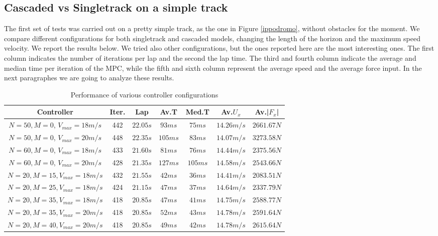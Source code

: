 \documentclass[a4paper, onecolumn, 11pt]{article}
\begin{document}
\subsection{Cascaded vs Singletrack on a simple track}
The first set of tests was carried out on a pretty simple track, as the one in
Figure \ref{ippodromo}, without obstacles for the moment. We compare different
configurations for both singletrack and cascaded models, changing the length of
the horizon and the maximum speed velocity. We report the results below. We
tried also other configurations, but the ones reported here are the most
interesting ones. The first column indicates the number of iterations per lap
and the second the lap time. The third and fourth column indicate the average
and median time per iteration of the MPC, while the fifth and sixth column
represent the average speed and the average force input. In the next paragraphes
we are going to analyze these results. 
\begin{table}[h] 
    \centering
    \caption{Performance of various controller configurations} \label{simulations}
    \hspace*{-1cm}
    \begin{tabular}{|c||c|c|c|c|c|c|}
        \hline
        \textbf{Controller} & \textbf{Iter.} & \textbf{Lap} & \textbf{Av.T} & \textbf{Med.T} & \textbf{Av.$U_x$} & \textbf{Av.|$F_x$|} \\ [0.5ex] 
        \hline
        \hline
        $N=50, M=0$, $V_{max}=18m/s$ & 442 & $22.05 s$ & $93 ms$ & $75 ms$ & $14.26 m/s$ & $2661.67 N$\\
        \hline
        $N=50, M=0$, $V_{max}=20m/s$ & 448 & $22.35 s$ & $105 ms$ & $83 ms$ & $14.07 m/s$ & $3273.58 N$\\
        \hline
        $N=60, M=0$, $V_{max}=18m/s$ & 433 & $21.60 s$ & $81 ms$ & $76 ms$ & $14.44 m/s$ & $2375.56 N$\\
        \hline
        $N=60, M=0$, $V_{max}=20m/s$ & 428 & $21.35 s$ & $127 ms$ & $105 ms$ & $14.58 m/s$ & $2543.66 N$\\
        \hline
        $N=20, M=15, V_{max}=18m/s$ & 432 & $21.55 s$ & $42 ms$ & $36 ms$ & $14.41 m/s$ & $2083.51 N$\\
        \hline
        $N=20, M=25, V_{max}=18m/s$ & 424 & $21.15 s$ & $47 ms$ & $37 ms$ & $14.64 m/s$ & $2337.79 N$\\
        \hline
        $N=20, M=35, V_{max}=18m/s$ & 418 & $20.85 s$ & $47 ms$ & $41 ms$ & $14.75 m/s$ & $2588.77 N$\\
        \hline
        $N=20, M=35, V_{max}=20m/s$ & 418 & $20.85 s$ & $52 ms$ & $43 ms$ & $14.78 m/s$ & $2591.64 N$\\
        \hline
        $N=20, M=40, V_{max}=20m/s$ & 418 & $20.85 s$ & $49 ms$ & $42 ms$ & $14.78 m/s$ & $2615.64 N$\\
        \hline
    \end{tabular}
    \label{experiments}
\end{table}
\end{document}
